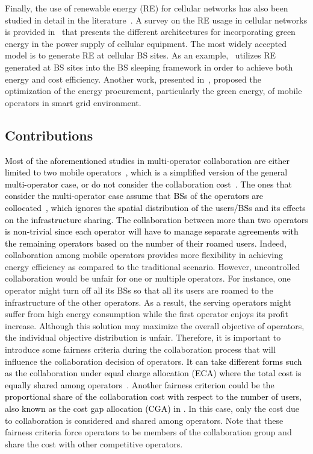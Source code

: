\documentclass[10pt, letter, twocolumn]{IEEEtran}
\begin{document}
Finally, the use of renewable energy (RE) for cellular networks has also been studied in detail in the literature~\cite{renewable,BS_sleeping_renewable}. A survey on the RE usage in cellular networks is provided in~\cite{renewable} that presents the different architectures for incorporating green energy in the power supply of cellular equipment. The most widely accepted model is to generate RE at cellular BS sites. As an example,~\cite{BS_sleeping_renewable} utilizes RE generated at BS sites into the BS sleeping framework in order to achieve both energy and cost efficiency. Another work, presented in~\cite{6778102}, proposed the optimization of the energy procurement, particularly the green energy, of mobile operators in smart grid environment.

\subsection{Contributions}
\textcolor{black}{Most of the aforementioned studies in multi-operator collaboration are either limited to two mobile operators~\cite{coop4}, which is a simplified version of the general multi-operator case, or do not consider the collaboration cost~\cite{network_sharing,coop2}. The ones that consider the multi-operator case assume that BSs of the operators are collocated~\cite{7417231,7124517}, which ignores the spatial distribution of the users/BSs and its effects on the infrastructure sharing. The collaboration between more than two operators is non-trivial since each operator will have to manage separate agreements with the remaining operators based on the number of their roamed users.} Indeed, collaboration among mobile operators provides more flexibility in achieving energy efficiency as compared to the traditional scenario. However, uncontrolled collaboration would be unfair for one or multiple operators. For instance, one operator might turn off all its BSs so that all its users are roamed to the infrastructure of the other operators. As a result, the serving operators might suffer from high energy consumption while the first operator enjoys its profit increase. Although this solution may maximize the overall objective of operators, the individual objective distribution is unfair. Therefore, it is important to introduce some fairness criteria during the collaboration process that will influence the collaboration decision of operators. \textcolor{black}{It can take different forms such as the collaboration under equal charge allocation (ECA) where the total cost is equally shared among operators~\cite{6347622}. Another fairness criterion could be the proportional share of the collaboration cost with respect to the number of users, also known as the cost gap allocation (CGA) in \cite{6347622}}. In this case, only the cost due to collaboration is considered and shared among operators. Note that these fairness criteria force operators to be members of the collaboration group and share the cost with other competitive operators.
\end{document}
